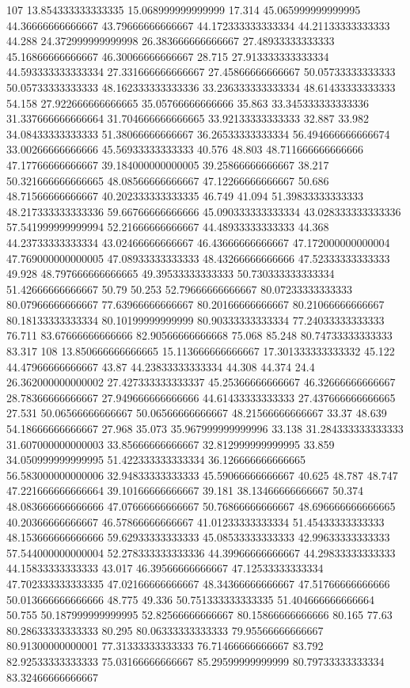 107 13.854333333333335 15.068999999999999 17.314 45.065999999999995 44.36666666666667 43.79666666666667 44.172333333333334 44.21133333333333 44.288 24.372999999999998 26.383666666666667 27.48933333333333 45.16866666666667 46.30066666666667 28.715 27.913333333333334 44.593333333333334 27.331666666666667 27.45866666666667 50.05733333333333 50.05733333333333 48.162333333333336 33.236333333333334 48.61433333333333 54.158 27.922666666666665 35.05766666666666 35.863 33.345333333333336 31.337666666666664 31.704666666666665 33.92133333333333 32.887 33.982 34.08433333333333 51.38066666666667 36.26533333333334 56.494666666666674 33.00266666666666 45.56933333333333 40.576 48.803 48.711666666666666 47.17766666666667 39.184000000000005 39.25866666666667 38.217 50.321666666666665 48.08566666666667 47.12266666666667 50.686 48.71566666666667 40.202333333333335 46.749 41.094 51.39833333333333 48.217333333333336 59.66766666666666 45.090333333333334 43.028333333333336 57.541999999999994 52.21666666666667 44.48933333333333 44.368 44.23733333333334 43.02466666666667 46.43666666666667 47.172000000000004 47.769000000000005 47.08933333333333 48.43266666666666 47.52333333333333 49.928 48.797666666666665 49.39533333333333 50.730333333333334 51.42666666666667 50.79 50.253 52.79666666666667 80.07233333333333 80.07966666666667 77.63966666666667 80.20166666666667 80.21066666666667 80.18133333333334 80.10199999999999 80.90333333333334 77.24033333333333 76.711 83.67666666666666 82.90566666666668 75.068 85.248 80.74733333333333 83.317
108 13.850666666666665 15.113666666666667 17.301333333333332 45.122 44.47966666666667 43.87 44.23833333333334 44.308 44.374 24.4 26.362000000000002 27.427333333333337 45.25366666666667 46.32666666666667 28.78366666666667 27.949666666666666 44.61433333333333 27.437666666666665 27.531 50.06566666666667 50.06566666666667 48.21566666666667 33.37 48.639 54.18666666666667 27.968 35.073 35.967999999999996 33.138 31.284333333333333 31.607000000000003 33.85666666666667 32.812999999999995 33.859 34.050999999999995 51.422333333333334 36.126666666666665 56.583000000000006 32.94833333333333 45.59066666666667 40.625 48.787 48.747 47.221666666666664 39.10166666666667 39.181 38.13466666666667 50.374 48.083666666666666 47.07666666666667 50.76866666666667 48.696666666666665 40.20366666666667 46.57866666666667 41.01233333333334 51.45433333333333 48.153666666666666 59.62933333333333 45.08533333333333 42.99633333333333 57.544000000000004 52.278333333333336 44.39966666666667 44.29833333333333 44.15833333333333 43.017 46.39566666666667 47.12533333333334 47.702333333333335 47.02166666666667 48.34366666666667 47.51766666666666 50.013666666666666 48.775 49.336 50.751333333333335 51.404666666666664 50.755 50.187999999999995 52.82566666666667 80.15866666666666 80.165 77.63 80.28633333333333 80.295 80.06333333333333 79.95566666666667 80.91300000000001 77.31333333333333 76.71466666666667 83.792 82.92533333333333 75.03166666666667 85.29599999999999 80.79733333333334 83.32466666666667

